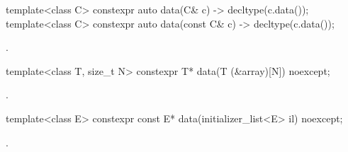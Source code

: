 %
\begin{itemdecl}
template<class C> constexpr auto data(C& c) -> decltype(c.data());
template<class C> constexpr auto data(const C& c) -> decltype(c.data());
\end{itemdecl}
\begin{itemdescr}
\pnum \returns {}.
\end{itemdescr}

%
\begin{itemdecl}
template<class T, size_t N> constexpr T* data(T (&array)[N]) noexcept;
\end{itemdecl}
\begin{itemdescr}
\pnum \returns {}.
\end{itemdescr}

%
\begin{itemdecl}
template<class E> constexpr const E* data(initializer_list<E> il) noexcept;
\end{itemdecl}
\begin{itemdescr}
\pnum \returns {}.
\end{itemdescr}
